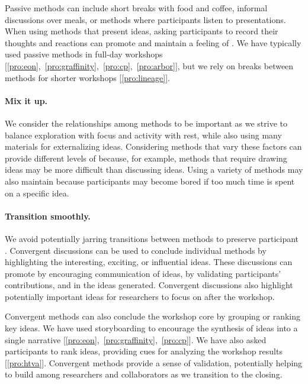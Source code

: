 Passive methods can include short breaks with food and coffee, informal discussions over meals, or methods where participants listen to presentations. When using methods that present ideas, asking participants to record their thoughts and reactions can promote \interest and maintain a feeling of \agency. We have typically used passive methods in full-day workshops [\ref{pro:eon},~\ref{pro:graffinity},~\ref{pro:cp},~\ref{pro:arbor}], but we rely on breaks between methods for shorter workshops [\ref{pro:lineage}].

\paragraph{Mix it up.} We consider the relationships among methods to be important as we strive to balance exploration with focus and activity with rest, while also using many materials for externalizing ideas. Considering methods that vary these factors can provide different levels of \challenge because, for example, methods that require drawing ideas may be more difficult than discussing ideas. Using a variety of methods may also maintain \interest because participants may become bored if too much time is spent on a specific idea.

\paragraph{Transition smoothly.} We avoid potentially jarring transitions between methods to preserve participant \interest. Convergent discussions can be used to conclude individual methods by highlighting the interesting, exciting, or influential ideas. These discussions can promote \collegiality by encouraging communication of ideas, \agency by validating participants' contributions, and \interest in the ideas generated. Convergent discussions also highlight potentially important ideas for researchers to focus on after the workshop.

Convergent methods can also conclude the workshop core by grouping or ranking key ideas. We have used storyboarding to encourage the synthesis of ideas into a single narrative [\ref{pro:eon},~\ref{pro:graffinity},~\ref{pro:cp}]. We have also asked participants to rank ideas, providing cues for analyzing the workshop results [\ref{pro:htva}]. Convergent methods provide a sense of validation, potentially helping to build \trust among researchers and collaborators as we transition to the closing. %

